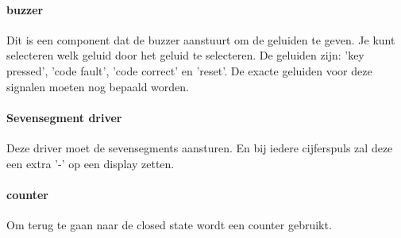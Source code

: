 \documentclass{article}
\begin{document}
    \paragraph{buzzer} Dit is een component dat de buzzer aanstuurt om de geluiden te geven. Je kunt selecteren welk geluid door het geluid te selecteren. De geluiden zijn: 'key pressed', 'code fault', 'code correct' en 'reset'. De exacte geluiden voor deze signalen moeten nog bepaald worden.

    \paragraph{Sevensegment driver} Deze driver moet de sevensegments aansturen. En bij iedere cijferspuls zal deze een extra '-' op een display zetten.

    \paragraph{counter} Om terug te gaan naar de closed state wordt een counter gebruikt.
\end{document}
